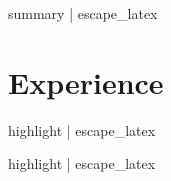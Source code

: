 \documentclass[10pt]{resume}
\begin{document}

{%
\vspace{0.5em}
{%
{%
{%

{%

{{ summary | escape_latex }}

\section{Experience}

{%
{%
{%
{%
{%
{%
\expblock
{%
{
{%
    \item {{ highlight | escape_latex }}
{%
}
{%

{%
{%
{%
{%
{%
{%
\expblock
{%
{
{%
    \item {{ highlight | escape_latex }}
{%
}
{%

}}}}}}}}}}}}}}}}}}}}}}}}}
\end{document}
